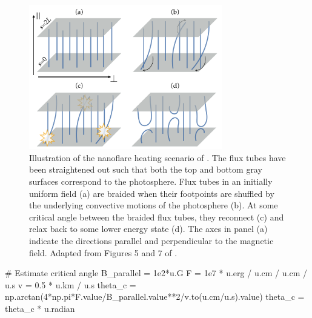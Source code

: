 \begin{figure}
    \centering
    \includegraphics[width=0.75\textwidth]{chapter1/figures/nanoflare-cartoon.pdf}
    \caption{Illustration of the nanoflare heating scenario of \citet{parker_nanoflares_1988}. The flux tubes have been straightened out such that both the top and bottom gray surfaces correspond to the photosphere. Flux tubes in an initially uniform field (a) are braided when their footpoints are shuffled by the underlying convective motions of the photosphere (b). At some critical angle between the braided flux tubes, they reconnect (c) and relax back to some lower energy state (d). The axes in panel (a) indicate the directions parallel and perpendicular to the magnetic field. Adapted from Figures 5 and 7 of \citet{klimchuk_key_2015}.}
    \label{fig:nanoflare-cartoon}
\end{figure}

\begin{pycode}[chapter2]
# Estimate critical angle
B_parallel = 1e2*u.G
F = 1e7 * u.erg / u.cm / u.cm / u.s
v = 0.5 * u.km / u.s
theta_c = np.arctan(4*np.pi*F.value/B_parallel.value**2/v.to(u.cm/u.s).value)
theta_c = theta_c * u.radian
\end{pycode}

